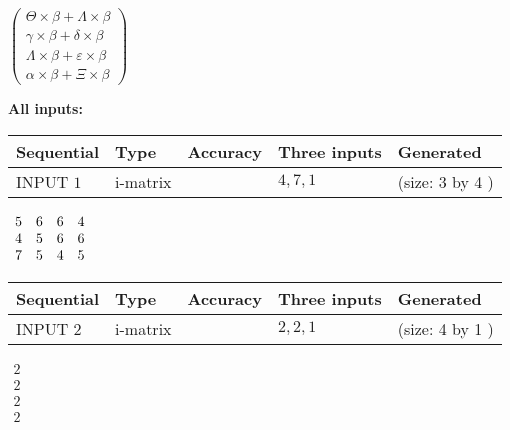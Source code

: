 \documentclass[12pt]{article}
\begin{document}
   
 $  \left( \begin{array}
 {
 c
 }
  \Theta \times  \beta +  \Lambda \times  \beta \\ 
  \gamma \times  \beta +  \delta \times  \beta \\ 
  \Lambda \times  \beta +  \varepsilon \times  \beta \\ 
  \alpha \times  \beta +                     \Xi \times  \beta
 \end{array} \right) $ 
   
   
\noindent\vspace{0.1in}\hspace{-0.08in} {\textbf{\Large{All inputs: }}}
   
   
  
  
\noindent\begin{tabular}{|l|l|l|l|l|}
\hline
 Sequential & Type & Accuracy & Three inputs & Generated \\ 
\hline
 
 
  INPUT $            1 $ & i-matrix &  & $
 4
 , 
 7
 , 
 1
 $ & (size:            3  by            4 )
 \\  \hline  
 \end{tabular}
   
   
 $\begin{array}{
 c
 c
 c
 c
 }
           5  & 
           6  & 
           6  & 
           4  \\ 
           4  & 
           5  & 
           6  & 
           6  \\ 
           7  & 
           5  & 
           4  & 
           5
\end{array}  $ 
  
  
\noindent\begin{tabular}{|l|l|l|l|l|}
\hline
 Sequential & Type & Accuracy & Three inputs & Generated \\ 
\hline
 
 
  INPUT $            2 $ & i-matrix &  & $
 2
 , 
 2
 , 
 1
 $ & (size:            4  by            1 )
 \\  \hline  
 \end{tabular}
   
   
 $\begin{array}{
 c
 }
           2  \\ 
           2  \\ 
           2  \\ 
           2
\end{array}  $ 
  
\end{document}
